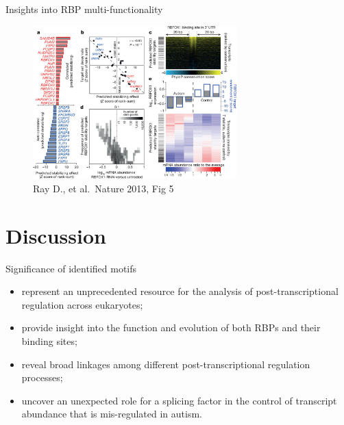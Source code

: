 \documentclass[professionalfont, 12pt, default]{beamer}
\providecommand{\tightlist}{%
    \setlength{\itemsep}{0pt}\setlength{\parskip}{0pt}}
\begin{document}
\begin{frame}{%
\protect\hypertarget{insights-into-rbp-multi-functionality-1}{%
Insights into RBP multi-functionality}}

\begin{figure}
\centering
\includegraphics[width=0.7\textwidth,height=\textheight]{img/f5.jpg}
\caption{Ray D., et al.~Nature 2013, Fig 5}
\end{figure}

\end{frame}

\hypertarget{discussion}{%
\section{Discussion}\label{discussion}}

\begin{frame}{%
\protect\hypertarget{significance-of-identified-motifs}{%
Significance of identified motifs}}

\begin{itemize}
\tightlist
\item
  represent an unprecedented resource for the analysis of
  post-transcriptional regulation across eukaryotes;
\item
  provide insight into the function and evolution of both RBPs and their
  binding sites;
\item
  reveal broad linkages among different post-transcriptional regulation
  processes;
\item
  uncover an unexpected role for a splicing factor in the control of
  transcript abundance that is mis-regulated in autism.
\end{itemize}

\end{frame}
\end{document}

